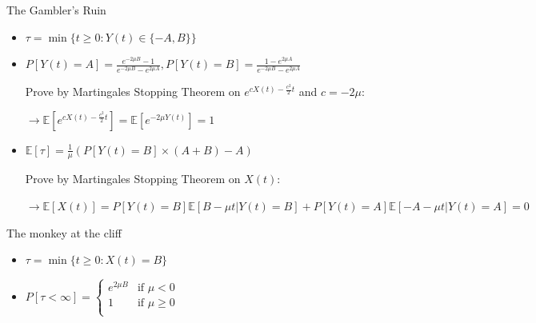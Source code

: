 \documentclass[a4paper]{article}
\begin{document}
\begin{itemize}
\begin{itemize}
\begin{itemize}
                            The Gambler's Ruin
                            \begin{itemize}
                                \item $\tau = \min\{t \geq 0: Y(t) \in \{-A, B\}\}$
                                \item $P[Y(t) = A ] = \frac{e^{-2\mu B} - 1}{e^{-2\mu B} - e^{2\mu A}}, P[Y(t) = B ] = \frac{1-e^{2\mu A}}{e^{-2\mu B} - e^{2\mu A}}$

                                    Prove by Martingales Stopping Theorem on $e^{cX(t) - \frac{c^2}{2}t}$ and $c = -2\mu$:

                                    $\rightarrow \mathbb{E}[e^{c X(t) - \frac{c^2}{2}t}] = \mathbb{E}[e^{-2\mu Y(t)}] = 1$

                                \item $\mathbb{E}[\tau] = \frac{1}{\mu}(P[Y(t) = B] \times (A + B) - A)$

                                    Prove by Martingales Stopping Theorem on $X(t)$:

                                    $\rightarrow \mathbb{E}[X(t)] = P[Y(t) = B] \mathbb{E}[B- \mu t|Y(t) = B] + P[Y(t) = A] \mathbb{E}[- A - \mu t|Y(t) = A] = 0$
                            \end{itemize}
                            The monkey at the cliff
                            \begin{itemize}
                                \item $\tau = \min\{t \geq 0: X(t) = B\}$
                                \item $P[\tau < \infty] = \left\{ \begin{array}{cc}
                                            e^{2\mu B} & \text{if } \mu < 0 \\ 
                                            1 & \text{if } \mu \geq 0 \\ 
                                \end{array}\right.$


\end{itemize}
\end{itemize}
\end{itemize}
\end{itemize}
\end{document}
